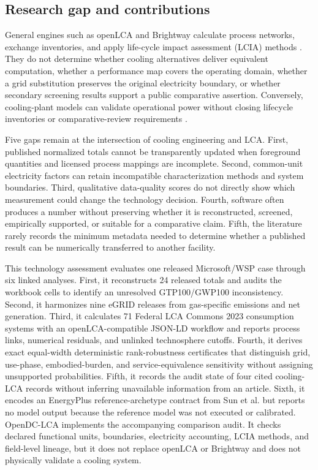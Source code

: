 \documentclass[review,12pt]{elsarticle}
\begin{document}
\subsection{Research gap and contributions}
General engines such as openLCA and Brightway calculate process networks, exchange inventories, and apply life-cycle impact assessment (LCIA) methods \cite{ref37,ref38}. They do not determine whether cooling alternatives deliver equivalent computation, whether a performance map covers the operating domain, whether a grid substitution preserves the original electricity boundary, or whether secondary screening results support a public comparative assertion. Conversely, cooling-plant models can validate operational power without closing lifecycle inventories or comparative-review requirements \cite{ref17}.

Five gaps remain at the intersection of cooling engineering and LCA. First, published normalized totals cannot be transparently updated when foreground quantities and licensed process mappings are incomplete. Second, common-unit electricity factors can retain incompatible characterization methods and system boundaries. Third, qualitative data-quality scores do not directly show which measurement could change the technology decision. Fourth, software often produces a number without preserving whether it is reconstructed, screened, empirically supported, or suitable for a comparative claim. Fifth, the literature rarely records the minimum metadata needed to determine whether a published result can be numerically transferred to another facility.

This technology assessment evaluates one released Microsoft/WSP case through six linked analyses. First, it reconstructs 24 released totals and audits the workbook cells to identify an unresolved GTP100/GWP100 inconsistency. Second, it harmonizes nine eGRID releases from gas-specific emissions and net generation. Third, it calculates 71 Federal LCA Commons 2023 consumption systems with an openLCA-compatible JSON-LD workflow and reports process links, numerical residuals, and unlinked technosphere cutoffs. Fourth, it derives exact equal-width deterministic rank-robustness certificates that distinguish grid, use-phase, embodied-burden, and service-equivalence sensitivity without assigning unsupported probabilities. Fifth, it records the audit state of four cited cooling-LCA records without inferring unavailable information from an article. Sixth, it encodes an EnergyPlus reference-archetype contract from Sun et al. \cite{ref49} but reports no model output because the reference model was not executed or calibrated. OpenDC-LCA implements the accompanying comparison audit. It checks declared functional units, boundaries, electricity accounting, LCIA methods, and field-level lineage, but it does not replace openLCA or Brightway and does not physically validate a cooling system.
\end{document}
